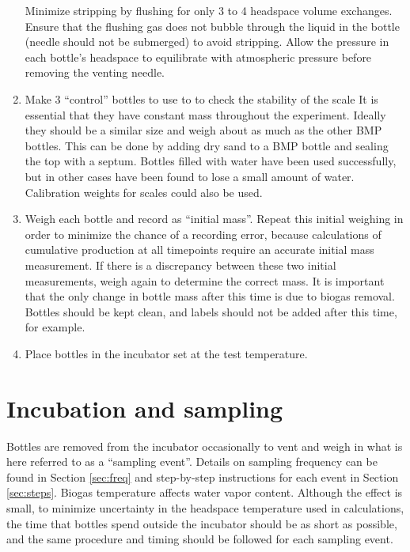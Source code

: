 \documentclass[]{article}
\begin{document}
\begin{enumerate}
{} 
      Minimize  stripping by flushing for only 3 to 4 headspace volume exchanges. 
      Ensure that the flushing gas does not bubble through the liquid in the bottle (needle should not be submerged) to avoid  stripping. 
      Allow the pressure in each bottle’s headspace to equilibrate with atmospheric pressure before removing the venting needle.
    \item Make 3 ``control'' bottles to use to to check the stability of the scale
      It is essential that they have constant mass throughout the experiment. 
      Ideally they should be a similar size and weigh about as much as the other BMP bottles.
      This can be done by adding dry sand to a BMP bottle and sealing the top with a septum. 
      Bottles filled with water have been used successfully, but in other cases have been found to lose a small amount of water.  
      Calibration weights for scales could also be used.
    \item Weigh each bottle and record as ``initial mass''. 
      Repeat this initial weighing in order to minimize the chance of a recording error, because calculations of cumulative  production at all timepoints require an accurate initial mass measurement.
      If there is a discrepancy between these two initial measurements, weigh again to determine the correct mass.
      It is important that the only change in bottle mass after this time is due to biogas removal.
      Bottles should be kept clean, and labels should not be added after this time, for example.
    \item Place bottles in the incubator set at the test temperature.
\end{enumerate}

\section{Incubation and sampling}
\label{sec:incsam}
Bottles are removed from the incubator occasionally to vent and weigh in what is here referred to as a ``sampling event''.
Details on sampling frequency can be found in Section \ref{sec:freq} and step-by-step instructions for each event in Section \ref{sec:steps}.
Biogas temperature affects water vapor content. 
Although the effect is small, to minimize uncertainty in the headspace temperature used in calculations, the time that bottles spend outside the incubator should be as short as possible, and the same procedure and timing should be followed for each sampling event. 
\end{document}
